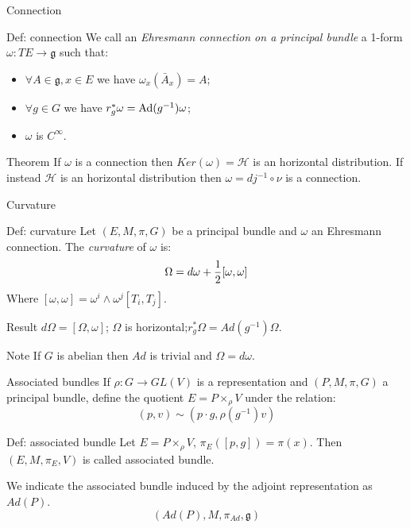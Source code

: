 \documentclass{beamer}
\begin{document}
\begin{frame}{Connection}
	\begin{exampleblock}{Def: connection}
			We call an \textit{Ehresmann connection on a principal bundle} a 1-form $\omega:TE\rightarrow \mathfrak{g}$ such that:
		\begin{itemize}
			\item $\forall A\in\mathfrak{g}, x\in E$ we have $\omega_{x}(\bar{A}_{x})=A$;
			\item $\forall g\in G$ we have $r^*_g\omega=\hbox{Ad}(g^{-1})\omega$;
			\item $\omega$ is $C^\infty$.
		\end{itemize}
	\end{exampleblock}
	\begin{alertblock}{Theorem}
		If $\omega$ is a connection then $Ker(\omega)=\mathcal{H}$ is an horizontal distribution. If instead $\mathcal{H}$ is an horizontal distribution then $\omega=dj^{-1}\circ \nu$ is a connection.
	\end{alertblock}
\end{frame}
\begin{frame}{Curvature}
	\begin{exampleblock}{Def: curvature}
		Let $(E,M,\pi,G)$ be a principal bundle and $\omega$ an Ehresmann connection. The \textit{curvature} of $\omega$ is:
		$$\Omega=d\omega+{1\over 2}[\omega,\omega]$$
		Where $[\omega,\omega]=\omega^i\wedge\omega^j[T_i,T_j]$.
	\end{exampleblock}
	\begin{block}{Result}
		$d\Omega=[\Omega,\omega]$; $\Omega$ is horizontal;$r^*_g\Omega=Ad(g^{-1})\Omega$.
	\end{block}		
	\begin{alertblock}{Note}
		If $G$ is abelian then $Ad$ is trivial and $\Omega=d\omega$.
	\end{alertblock}
\end{frame}
\begin{frame}{Associated bundles}
	If $\rho:G\rightarrow GL(V)$ is a representation and $(P,M,\pi,G)$ a principal bundle, define the quotient $E=P\times_\rho V$
	under the relation:
	$$(p,v)\sim(p\cdot g, \rho(g^{-1})v)$$
	\begin{exampleblock}{Def: associated bundle}
			Let $E=P\times_\rho V$, $\pi_E([p,g])=\pi(x)$. Then  $(E,M,\pi_E,V)$ is called associated bundle.
	\end{exampleblock}
		We indicate the associated bundle induced by the adjoint representation as $Ad(P)$.
		$$(Ad(P),M,\pi_{Ad},\mathfrak{g})$$
\end{frame}
\end{document}
